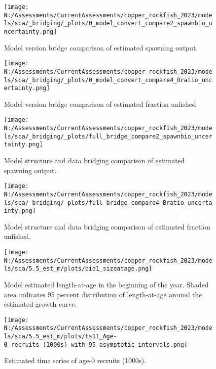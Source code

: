 \documentclass[11pt,
  english,
  letterpaper,
]{article}
\begin{document}
\begin{figure}
\centering
\texttt{[image: N:/Assessments/CurrentAssessments/copper\_rockfish\_2023/models/sca/\_bridging/\_plots/0\_model\_convert\_compare2\_spawnbio\_uncertainty.png]}
\caption{Model version bridge comparison of estimated spawning output.\label{fig:bridge-ssb}}
\end{figure}

\begin{figure}
\centering
\texttt{[image: N:/Assessments/CurrentAssessments/copper\_rockfish\_2023/models/sca/\_bridging/\_plots/0\_model\_convert\_compare4\_Bratio\_uncertainty.png]}
\caption{Model version bridge comparison of estimated fraction unfished.\label{fig:bridge-depl}}
\end{figure}

\begin{figure}
\centering
\texttt{[image: N:/Assessments/CurrentAssessments/copper\_rockfish\_2023/models/sca/\_bridging/\_plots/full\_bridge\_compare2\_spawnbio\_uncertainty.png]}
\caption{Model structure and data bridging comparison of estimated spawning output.\label{fig:data-bridge-ssb}}
\end{figure}

\begin{figure}
\centering
\texttt{[image: N:/Assessments/CurrentAssessments/copper\_rockfish\_2023/models/sca/\_bridging/\_plots/full\_bridge\_compare4\_Bratio\_uncertainty.png]}
\caption{Model structure and data bridging comparison of estimated fraction unfished.\label{fig:data-bridge-depl}}
\end{figure}

\begin{figure}
\centering
\texttt{[image: N:/Assessments/CurrentAssessments/copper\_rockfish\_2023/models/sca/5.5\_est\_m/plots/bio1\_sizeatage.png]}
\caption{Model estimated length-at-age in the beginning of the year. Shaded area indicates 95 percent distribution of length-at-age around the estimated growth curve.\label{fig:mod-est-len-age}}
\end{figure}

\begin{figure}
\centering
\texttt{[image: N:/Assessments/CurrentAssessments/copper\_rockfish\_2023/models/sca/5.5\_est\_m/plots/ts11\_Age-0\_recruits\_(1000s)\_with\_95\_asymptotic\_intervals.png]}
\caption{Estimated time series of age-0 recruits (1000s).\label{fig:recruits}}
\end{figure}
\end{document}
